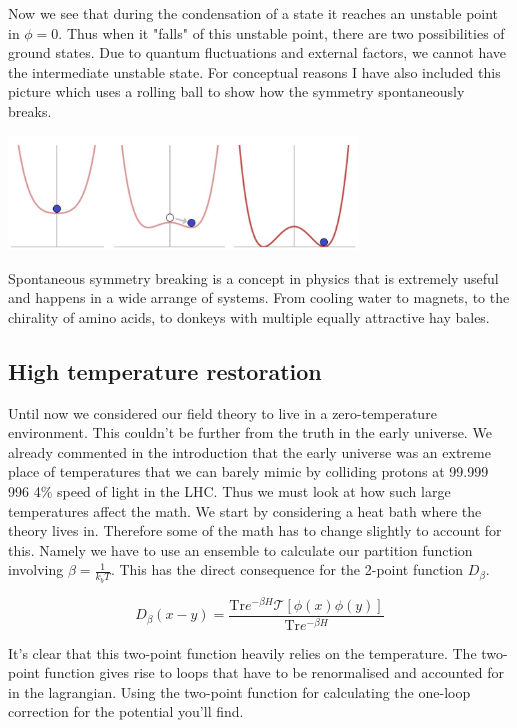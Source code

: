 \documentclass{article}
\numberwithin{equation}{section}
\begin{document}
Now we see that during the condensation of a state it reaches an unstable point in $\phi=0$.
Thus when it "falls" of this unstable point, there are two possibilities of ground states.
Due to quantum fluctuations and external factors, we cannot have the intermediate unstable state.
For conceptual reasons I have also included this picture which uses a rolling ball to show how the symmetry spontaneously breaks.

\begin{center}
\includegraphics[width=350px]{Knipsel3.PNG}    
\end{center}


Spontaneous symmetry breaking is a concept in physics that is extremely useful and happens in a wide arrange of systems.
From cooling water to magnets, to the chirality of amino acids, to donkeys with multiple equally attractive hay bales.





\subsection{High temperature restoration}

Until now we considered our field theory to live in a zero-temperature environment.
This couldn't be further from the truth in the early universe.
We already commented in the introduction that the early universe was an extreme place of temperatures that we can barely mimic by colliding protons at 99.999 996 4\% speed of light in the LHC.
Thus we must look at how such large temperatures affect the math.
We start by considering a heat bath where the theory lives in.
Therefore some of the math has to change slightly to account for this.
Namely we have to use an ensemble to calculate our partition function involving $\beta=\frac{1}{k_bT}$.
This has the direct consequence for the 2-point function $D_\beta$.

$$D_\beta (x-y)=\frac{\text{Tr} e^{-\beta H}\mathcal{T}[\phi(x)\phi(y)]}{\text{Tr} e^{-\beta H}}$$

It's clear that this two-point function heavily relies on the temperature.
The two-point function gives rise to loops that have to be renormalised and accounted for in the lagrangian.
Using the two-point function for calculating the one-loop correction for the potential you'll find.
\end{document}
